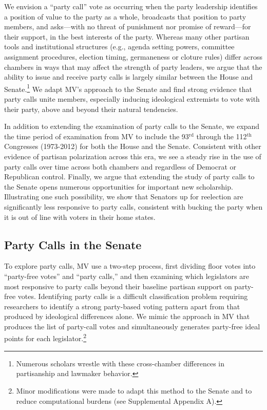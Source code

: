 \documentclass[12pt]{article}
\begin{document}
We envision a ``party call'' vote as occurring when the party leadership
identifies a position of value to the party as a whole, broadcasts that position
to party members, and asks---with no threat of punishment nor promise of
reward---for their support, in the best interests of the party.
Whereas many other partisan tools and institutional structures (e.g., agenda
setting powers, committee assignment procedures, election timing, germaneness
or cloture rules) differ across chambers in ways that may affect the strength of
party leaders, we argue that the ability to issue and receive party calls is
largely similar between the House and Senate.\footnote{
  \doublespacing\normalsize
  Numerous scholars \citep[e.g.,][]{DenHartog:2011, Madonna:2011,
  Sinclair:2017, Smith:2007} wrestle with these cross-chamber differences in
  partisanship and lawmaker behavior.}
We adapt MV's approach to the Senate and find strong evidence that party
calls unite members, especially inducing ideological extremists to vote with
their party, above and beyond their natural tendencies.

In addition to extending the examination of party calls to the Senate, we
expand the time period of examination from MV to include the 93$^{\text{rd}}$
through the 112$^{\text{th}}$ Congresses (1973-2012) for both the House and the
Senate.
Consistent with other evidence of partisan polarization across this era, we see
a steady rise in the use of party calls over time across both chambers and
regardless of Democrat or Republican control.
Finally, we argue that extending the study of party calls to the Senate opens
numerous opportunities for important new scholarship.
Illustrating one such possibility, we show that Senators up for reelection are
significantly less responsive to party calls, consistent with bucking the party
when it is out of line with voters in their home states.


\subsection*{Party Calls in the Senate}


To explore party calls, MV use a two-step process, first dividing floor votes
into ``party-free votes'' and ``party calls,'' and then examining which
legislators are most responsive to party calls beyond their baseline partisan
support on party-free votes.
Identifying party calls is a difficult classification problem requiring
researchers to identify a strong party-based voting pattern apart from that
produced by ideological differences alone.
We mimic the approach in MV that produces the list of party-call votes and
simultaneously generates party-free ideal points for each legislator.\footnote{
  \doublespacing\normalsize
  Minor modifications were made to adapt this method to the Senate and to
  reduce computational burdens (see Supplemental Appendix A).}
\end{document}
